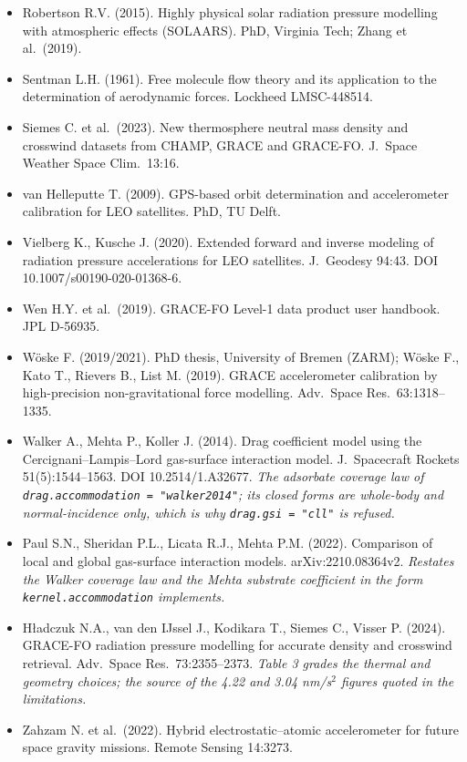 \begin{itemize}[nosep,leftmargin=*]
\item Robertson R.V. (2015). Highly physical solar radiation pressure modelling with atmospheric effects (SOLAARS). PhD, Virginia Tech; Zhang et al.\ (2019).
\item Sentman L.H. (1961). Free molecule flow theory and its application to the determination of aerodynamic forces. Lockheed LMSC-448514.
\item Siemes C. et al.\ (2023). New thermosphere neutral mass density and crosswind datasets from CHAMP, GRACE and GRACE-FO. J.\ Space Weather Space Clim.\ 13:16.
\item van Helleputte T. (2009). GPS-based orbit determination and accelerometer calibration for LEO satellites. PhD, TU Delft.
\item Vielberg K., Kusche J. (2020). Extended forward and inverse modeling of radiation pressure accelerations for LEO satellites. J.\ Geodesy 94:43. DOI 10.1007/s00190-020-01368-6.
\item Wen H.Y. et al.\ (2019). GRACE-FO Level-1 data product user handbook. JPL D-56935.
\item Wöske F. (2019/2021). PhD thesis, University of Bremen (ZARM); Wöske F., Kato T., Rievers B., List M. (2019). GRACE accelerometer calibration by high-precision non-gravitational force modelling. Adv.\ Space Res.\ 63:1318--1335.
\item Walker A., Mehta P., Koller J. (2014). Drag coefficient model using the Cercignani--Lampis--Lord gas-surface interaction model. J.\ Spacecraft Rockets 51(5):1544--1563. DOI 10.2514/1.A32677. \emph{The adsorbate coverage law of \texttt{drag.accommodation = "walker2014"}; its closed forms are whole-body and normal-incidence only, which is why \texttt{drag.gsi = "cll"} is refused.}
\item Paul S.N., Sheridan P.L., Licata R.J., Mehta P.M. (2022). Comparison of local and global gas-surface interaction models. arXiv:2210.08364v2. \emph{Restates the Walker coverage law and the Mehta substrate coefficient in the form \texttt{kernel.accommodation} implements.}
\item H\l{}adczuk N.A., van den IJssel J., Kodikara T., Siemes C., Visser P. (2024). GRACE-FO radiation pressure modelling for accurate density and crosswind retrieval. Adv.\ Space Res.\ 73:2355--2373. \emph{Table 3 grades the thermal and geometry choices; the source of the 4.22 and 3.04 nm/s$^2$ figures quoted in the limitations.}
\item Zahzam N. et al.\ (2022). Hybrid electrostatic--atomic accelerometer for future space gravity missions. Remote Sensing 14:3273.
\end{itemize}
